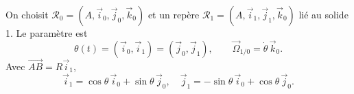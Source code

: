 \begin{corrigebox}
On choisit $\mathcal R_0=(A,\vec i_0,\vec j_0,\vec k_0)$ et un repère
$\mathcal R_1=(A,\vec i_1,\vec j_1,\vec k_0)$ lié au solide 1. Le paramètre est
\[\theta(t)=(\vec i_0,\vec i_1)=(\vec j_0,\vec j_1),\qquad
  \vec\Omega_{1/0}=\dot\theta\,\vec k_0.\]
Avec $\overrightarrow{AB}=R\vec i_1$,
\[
\vec i_1=\cos\theta\,\vec i_0+\sin\theta\,\vec j_0,
\quad
\vec j_1=-\sin\theta\,\vec i_0+\cos\theta\,\vec j_0.
\]
\end{corrigebox}
